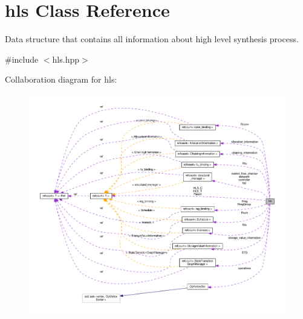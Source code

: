 \hypertarget{classhls}{}\section{hls Class Reference}
\label{classhls}


Data structure that contains all information about high level synthesis process.  




{\ttfamily \#include $<$hls.\+hpp$>$}



Collaboration diagram for hls\+:
\nopagebreak
\begin{figure}[H]
\begin{center}
\leavevmode
\includegraphics[width=350pt]{de/dcb/classhls__coll__graph}
\end{center}
\end{figure}
